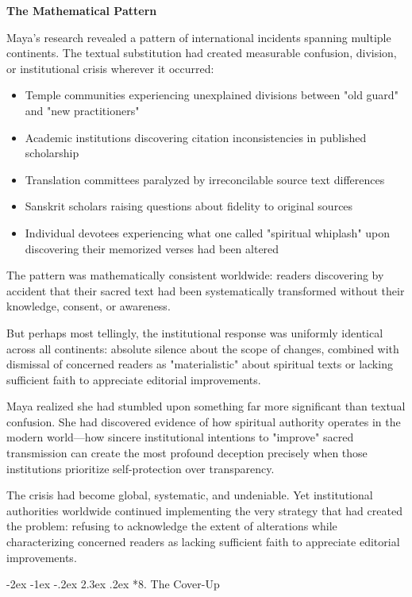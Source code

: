 \documentclass[12pt,twoside]{book}
\makeatletter
\def\cleardoublepage{\clearpage\if@twoside \ifodd\c@page\else\hbox{}\thispagestyle{empty}\newpage\if@twocolumn\hbox{}\newpage\fi\fi\fi}
\renewcommand\section{\@startsection{section}{1}{\z@}%
{-2ex \@plus -1ex \@minus -.2ex}%
{2.3ex \@plus.2ex}%
{\normalfont\Large\bfseries}}
\makeatother
\begin{document}
\textbf{\textbf{The Mathematical Pattern}}

Maya's research revealed a pattern of international incidents spanning multiple continents. The textual substitution had created measurable confusion, division, or institutional crisis wherever it occurred:

\begin{itemize}
\item Temple communities experiencing unexplained divisions between "old guard" and "new practitioners"
\item Academic institutions discovering citation inconsistencies in published scholarship
\item Translation committees paralyzed by irreconcilable source text differences
\item Sanskrit scholars raising questions about fidelity to original sources
\item Individual devotees experiencing what one called "spiritual whiplash" upon discovering their memorized verses had been altered
\end{itemize}

The pattern was mathematically consistent worldwide: readers discovering by accident that their sacred text had been systematically transformed without their knowledge, consent, or awareness.

But perhaps most tellingly, the institutional response was uniformly identical across all continents: absolute silence about the scope of changes, combined with dismissal of concerned readers as "materialistic" about spiritual texts or lacking sufficient faith to appreciate editorial improvements.

Maya realized she had stumbled upon something far more significant than textual confusion. She had discovered evidence of how spiritual authority operates in the modern world—how sincere institutional intentions to "improve" sacred transmission can create the most profound deception precisely when those institutions prioritize self-protection over transparency.

The crisis had become global, systematic, and undeniable. Yet institutional authorities worldwide continued implementing the very strategy that had created the problem: refusing to acknowledge the extent of alterations while characterizing concerned readers as lacking sufficient faith to appreciate editorial improvements.

\cleardoublepage
\vspace*{0.20\textheight}
\section*{8. The Cover-Up}
\thispagestyle{chapterpage}
\end{document}
